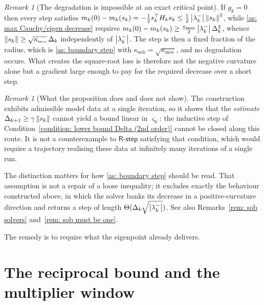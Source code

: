 \documentclass[11pt]{article}
\theoremstyle{plain}
\theoremstyle{definition}
\theoremstyle{remark}
\newtheorem{remark}[theorem]{Remark}
\numberwithin{equation}{section}
\newcommand*\mykappa[1]{\kappa_{\scriptscriptstyle\text{#1}}}
\newcommand{\Rstep}{\textsf{R-step}}
\begin{document}
\begin{remark}[The degradation is impossible at an exact critical point]
\label{rem: degradation needs a gradient}
    If $g_k = 0$ then every step satisfies
    $m_k(0) - m_k(s_k) = -\tfrac12 s_k^\top H_k s_k \leq \tfrac12\left \vert \lambda_k^- \right \vert\left \lVert s_k \right \rVert^2$,
    while \ref{as: max Cauchy/eigen decrease} requires
    $m_k(0) - m_k(s_k) \geq \tfrac{\mykappa{moc}}{2}\abs{\lambda_k^-}\Delta_k^2$, whence
    $\norm{s_k} \geq \sqrt{\mykappa{moc}}\,\Delta_k$ independently of $\left \vert \lambda_k^- \right \vert$. The step
    is then a fixed fraction of the radius, which is \ref{as: boundary step} with
    $\mykappa{sob} = \sqrt{\mykappa{moc}}$, and no degradation occurs. What creates the square-root
    loss is therefore not the negative curvature alone but a gradient large enough to pay for the
    required decrease over a short step.
\end{remark}

\begin{remark}[What the proposition does and does not show]
\label{rem: degradation scope}
    The construction exhibits admissible model data at a single iteration, so it shows that the
    \emph{estimate} $\Delta_{k+1} \geq \gamma\left \lVert s_k \right \rVert$ cannot yield a bound linear in
    $\varsigma_k$: the inductive step of
    Condition~\ref{condition: lower bound Delta (2nd order)} cannot be closed along this route. It
    is not a counterexample to $\Rstep$ satisfying that condition, which would require a trajectory
    realising these data at infinitely many iterations of a single run.

    The distinction matters for how \ref{as: boundary step} should be read. That assumption is
    not a repair of a loose inequality; it excludes exactly the behaviour constructed above, in
    which the solver banks its decrease in a positive-curvature direction and returns a step of
    length $\Theta(\Delta_k\sqrt{\left \vert \lambda_k^- \right \vert})$. See also
    Remarks~\ref{rem: sob solvers} and~\ref{rem: sob must be one}.
\end{remark}

The remedy is to require what the eigenpoint already delivers.

\section{The reciprocal bound and the multiplier window}

\end{document}
